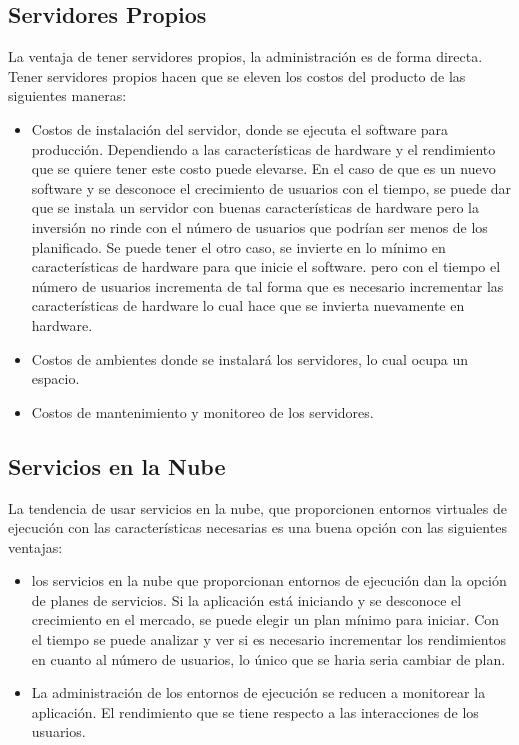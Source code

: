 \subsection{Servidores Propios}
\noindent La ventaja de tener servidores propios, la administración es de forma directa. Tener servidores propios hacen que se eleven los costos del producto de las siguientes maneras:
\begin{itemize}
\item Costos de instalación del servidor, donde se ejecuta el software para producción. Dependiendo a las características de hardware y el rendimiento que se quiere tener este costo puede elevarse. En el caso de que es un nuevo software y se desconoce el crecimiento de usuarios con el tiempo, se puede dar que se instala un servidor con buenas características de hardware pero la inversión no rinde con el número de usuarios que podrían ser menos de los planificado. Se puede tener el otro caso, se invierte en lo mínimo en características de hardware para que inicie el software. pero con el tiempo el número de usuarios incrementa de tal forma que es necesario incrementar las características de hardware lo cual hace que se invierta nuevamente en hardware.
\item Costos de ambientes donde se instalará los servidores, lo cual ocupa un espacio.
\item Costos de mantenimiento y monitoreo de los servidores. 
\end{itemize}

\subsection{Servicios en la Nube} 
\noindent La tendencia de usar servicios en la nube, que proporcionen entornos virtuales de ejecución con las características necesarias es una buena opción con las siguientes ventajas:
\begin{itemize}
\item los servicios en la nube que proporcionan entornos de ejecución dan la opción de planes de servicios. Si la aplicación está iniciando y se desconoce el crecimiento en el mercado, se puede elegir un plan mínimo para iniciar. Con el tiempo se puede analizar y ver si es necesario incrementar los rendimientos en cuanto al número de usuarios, lo único que se haria seria cambiar de plan.
\item La administración de los entornos de ejecución se reducen a monitorear la aplicación. El rendimiento que se tiene respecto a las interacciones de los usuarios.
\end{itemize}

